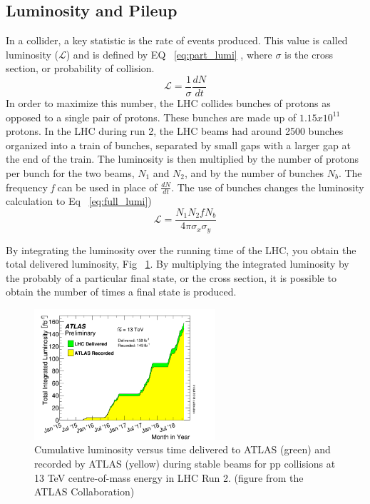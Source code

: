 \subsection{Luminosity and Pileup}
In a collider, a key statistic is the rate of events produced. This value is called luminosity (${\mathcal{L}}$) and is defined by EQ ~\ref{eq:part_lumi} \cite{Aaboud:2016hhf}, where ${\sigma}$ is the cross section, or probability of collision.
\begin{equation}
\label{eq:part_lumi}
\mathcal{L} = \frac{1}{\sigma}\frac{dN}{dt}
\end{equation}
In order to maximize this number, the LHC collides bunches of protons as opposed to a single pair of protons. These bunches are made up of ${1.15x10^{11}}$ protons. In the LHC during run 2, the LHC beams had around 2500 bunches organized into a train of bunches, separated by small gaps with a larger gap at the end of the train. The luminosity is then multiplied by the number of protons per bunch for the two beams, ${N_{1}}$ and ${N_{2}}$, and by the number of bunches ${N_{b}}$. The frequency \textit{f} can be used in place of ${\frac{dN}{dt}}$.  The use of bunches changes the luminosity calculation to Eq ~\ref{eq:full_lumi})
\linebreak
\begin{equation}
\label{eq:full_lumi}
\mathcal{L} = \frac{N_{1}N_{2}fN_{b}}{4\pi\sigma_{x}\sigma_{y}}
\end{equation}

\indent By integrating the luminosity over the running time of the LHC, you obtain the total delivered luminosity, Fig ~\ref{fig:lumi}. By multiplying the integrated luminosity by the probably of a particular final state, or the cross section, it is possible to obtain the number of times a final state is produced.\linebreak

\begin{figure}[H]
\begin{center}
\includegraphics*[width=0.60\textwidth] {figures/intlumivstimeRun2}%
\caption[Integrated Lumi]{Cumulative luminosity versus time delivered to ATLAS (green) and recorded by ATLAS (yellow) during stable beams for pp collisions at 13 TeV centre-of-mass energy in LHC Run 2.  (figure from the ATLAS Collaboration)}
\label{fig:lumi}
\end{center}
\end{figure}

